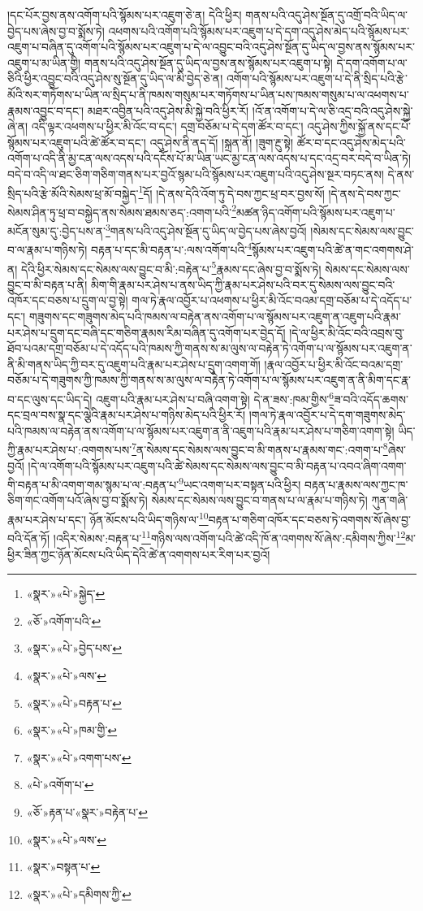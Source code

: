 །དང་པོར་བྱས་ནས་འགོག་པའི་སྙོམས་པར་འཇུག་ཅེ་ན། དེའི་ཕྱིར། གནས་པའི་འདུ་ཤེས་སྔོན་དུ་འགྲོ་བའི་ཡིད་ལ་བྱེད་པས་ཞེས་བྱ་བ་སྨོས་ཏེ། འཕགས་པའི་འགོག་པའི་སྙོམས་པར་འཇུག་པ་དེ་དག་འདུ་ཤེས་མེད་པའི་སྙོམས་པར་འཇུག་པ་བཞིན་དུ་འགོག་པའི་སྙོམས་པར་འཇུག་པ་དེ་ལ་འབྱུང་བའི་འདུ་ཤེས་སྔོན་དུ་ཡིད་ལ་བྱས་ནས་སྙོམས་པར་འཇུག་པ་མ་ཡིན་གྱི། གནས་པའི་འདུ་ཤེས་སྔོན་དུ་ཡིད་ལ་བྱས་ནས་སྙོམས་པར་འཇུག་པ་སྟེ། དེ་དག་འགོག་པ་ལ་ཅིའི་ཕྱིར་འབྱུང་བའི་འདུ་ཤེས་སུ་སྔོན་དུ་ཡིད་ལ་མི་བྱེད་ཅེ་ན། འགོག་པའི་སྙོམས་པར་འཇུག་པ་དེ་ནི་སྲིད་པའི་རྩེ་མོའི་སར་གཏོགས་པ་ཡིན་ལ་སྲིད་པ་ནི་ཁམས་གསུམ་པར་གཏོགས་པ་ཡིན་པས་ཁམས་གསུམ་པ་ལ་འཕགས་པ་རྣམས་འབྱུང་བ་དང་། མཐར་འབྱིན་པའི་འདུ་ཤེས་མི་སྐྱེ་བའི་ཕྱིར་རོ། །འོ་ན་འགོག་པ་དེ་ལ་ཅི་འདྲ་བའི་འདུ་ཤེས་སྐྱེ་ཞེ་ན། འདི་ལྟར་འཕགས་པ་ཕྱིར་མི་འོང་བ་དང་། དགྲ་བཅོམ་པ་དེ་དག་ཚོར་བ་དང་། འདུ་ཤེས་ཀྱིས་སྐྱོ་ནས་དང་པོ་སྙོམས་པར་འཇུག་པའི་ཚེ་ཚོར་བ་དང་། འདུ་ཤེས་ནི་ནད་དོ། །སྐྲན་ནོ། །ཟུག་རྔུ་སྟེ། ཚོར་བ་དང་འདུ་ཤེས་མེད་པའི་འགོག་པ་འདི་ནི་མྱ་ངན་ལས་འདས་པའི་དངོས་པོ་མ་ཡིན་ཡང་མྱ་ངན་ལས་འདས་པ་དང་འདྲ་བར་བདེ་བ་ཡིན་ཏེ། བདེ་བ་འདི་ལ་ཐང་ཅིག་གཅིག་གནས་པར་བྱའོ་སྙམ་པའི་སྙོམས་པར་འཇུག་པའི་འདུ་ཤེས་སྔར་བཏང་ནས། དེ་ནས་སྲིད་པའི་རྩེ་མོའི་སེམས་ཕྲ་མོ་བསྐྱེད་\footnote{«སྣར་»«པེ་»སྐྱེད་}དོ། །དེ་ནས་དེའི་འོག་ཏུ་དེ་བས་ཀྱང་ཕྲ་བར་བྱས་སོ། །དེ་ནས་དེ་བས་ཀྱང་སེམས་ཤིན་ཏུ་ཕྲ་བ་བསྐྱེད་ནས་སེམས་ཐམས་ཅད་:འགག་པའི་\footnote{«ཅོ་»འགོག་པའི་}མཚན་ཉིད་འགོག་པའི་སྙོམས་པར་འཇུག་པ་མངོན་སུམ་དུ་:བྱེད་པས་ན་\footnote{«སྣར་»«པེ་»བྱེད་པས་}གནས་པའི་འདུ་ཤེས་སྔོན་དུ་ཡིད་ལ་བྱེད་པས་ཞེས་བྱའོ། །སེམས་དང་སེམས་ལས་བྱུང་བ་ལ་རྣམ་པ་གཉིས་ཏེ། བརྟན་པ་དང་མི་བརྟན་པ་:ལས་འགོག་པའི་\footnote{«སྣར་»«པེ་»ལས་}སྙོམས་པར་འཇུག་པའི་ཚེ་ན་གང་འགགས་ཤེ་ན། དེའི་ཕྱིར་སེམས་དང་སེམས་ལས་བྱུང་བ་མི་:བརྟེན་པ་\footnote{«སྣར་»«པེ་»བརྟན་པ་}རྣམས་དང་ཞེས་བྱ་བ་སྨོས་ཏེ། སེམས་དང་སེམས་ལས་བྱུང་བ་མི་བརྟན་པ་ནི། མིག་གི་རྣམ་པར་ཤེས་པ་ནས་ཡིད་ཀྱི་རྣམ་པར་ཤེས་པའི་བར་དུ་སེམས་ལས་བྱུང་བའི་འཁོར་དང་བཅས་པ་དྲུག་ལ་བྱ་སྟེ། གལ་ཏེ་རྣལ་འབྱོར་པ་འཕགས་པ་ཕྱིར་མི་འོང་བའམ་དགྲ་བཅོམ་པ་དེ་འདོད་པ་དང་། གཟུགས་དང་གཟུགས་མེད་པའི་ཁམས་ལ་བརྟེན་ནས་འགོག་པ་ལ་སྙོམས་པར་འཇུག་ན་འཇུག་པའི་རྣམ་པར་ཤེས་པ་དྲུག་དང་བཞི་དང་གཅིག་རྣམས་རིམ་བཞིན་དུ་འགོག་པར་བྱེད་དོ། །དེ་ལ་ཕྱིར་མི་འོང་བའི་འབྲས་བུ་ཐོབ་པའམ་དགྲ་བཅོམ་པ་དེ་འདོད་པའི་ཁམས་ཀྱི་གནས་ས་མ་ལུས་ལ་བརྟེན་ཏེ་འགོག་པ་ལ་སྙོམས་པར་འཇུག་ན་ནི་མི་གནས་ཡིད་ཀྱི་བར་དུ་འཇུག་པའི་རྣམ་པར་ཤེས་པ་དྲུག་འགག་གོ། །རྣལ་འབྱོར་པ་ཕྱིར་མི་འོང་བའམ་དགྲ་བཅོམ་པ་དེ་གཟུགས་ཀྱི་ཁམས་ཀྱི་གནས་ས་མ་ལུས་ལ་བརྟེན་ཏེ་འགོག་པ་ལ་སྙོམས་པར་འཇུག་ན་ནི་མིག་དང་རྣ་བ་དང་ལུས་དང་ཡིད་དེ། འཇུག་པའི་རྣམ་པར་ཤེས་པ་བཞི་འགག་སྟེ། དེ་ན་ཟས་:ཁམ་གྱིས་\footnote{«སྣར་»«པེ་»ཁམ་གྱི་}ཟ་བའི་འདོད་ཆགས་དང་བྲལ་བས་སྣ་དང་ལྕེའི་རྣམ་པར་ཤེས་པ་གཉིས་མེད་པའི་ཕྱིར་རོ། །གལ་ཏེ་རྣལ་འབྱོར་པ་དེ་དག་གཟུགས་མེད་པའི་ཁམས་ལ་བརྟེན་ནས་འགོག་པ་ལ་སྙོམས་པར་འཇུག་ན་ནི་འཇུག་པའི་རྣམ་པར་ཤེས་པ་གཅིག་འགག་སྟེ། ཡིད་ཀྱི་རྣམ་པར་ཤེས་པ་:འགགས་པས་\footnote{«སྣར་»«པེ་»འགག་པས་}ན་སེམས་དང་སེམས་ལས་བྱུང་བ་མི་གནས་པ་རྣམས་གང་:འགག་པ་\footnote{«པེ་»འགོག་པ་}ཞེས་བྱའོ། །དེ་ལ་འགོག་པའི་སྙོམས་པར་འཇུག་པའི་ཚེ་སེམས་དང་སེམས་ལས་བྱུང་བ་མི་བརྟན་པ་འབའ་ཞིག་འགག་གི་བརྟན་པ་མི་འགག་གམ་སྙམ་པ་ལ་:བརྟན་པ་\footnote{«ཅོ་»རྟན་པ་«སྣར་»བརྟེན་པ་}ཡང་འགག་པར་བསྟན་པའི་ཕྱིར། བརྟན་པ་རྣམས་ལས་ཀྱང་ཁ་ཅིག་གང་འགོག་པའོ་ཞེས་བྱ་བ་སྨོས་ཏེ། སེམས་དང་སེམས་ལས་བྱུང་བ་གནས་པ་ལ་རྣམ་པ་གཉིས་ཏེ། ཀུན་གཞི་རྣམ་པར་ཤེས་པ་དང་། ཉོན་མོངས་པའི་ཡིད་གཉིས་ལ་\footnote{«སྣར་»«པེ་»ལས་}བརྟན་པ་གཅིག་འཁོར་དང་བཅས་ཏེ་འགགས་སོ་ཞེས་བྱ་བའི་དོན་ཏོ། །འདིར་སེམས་:བརྟན་པ་\footnote{«སྣར་»བསྟན་པ་}གཉིས་ལས་འགོག་པའི་ཚེ་འདི་ཁོ་ན་འགགས་སོ་ཞེས་:དམིགས་ཀྱིས་\footnote{«སྣར་»«པེ་»དམིགས་ཀྱི་}མ་ཕྱིར་ཟིན་ཀྱང་ཉོན་མོངས་པའི་ཡིད་དེའི་ཚེ་ན་འགགས་པར་རིག་པར་བྱའོ། 